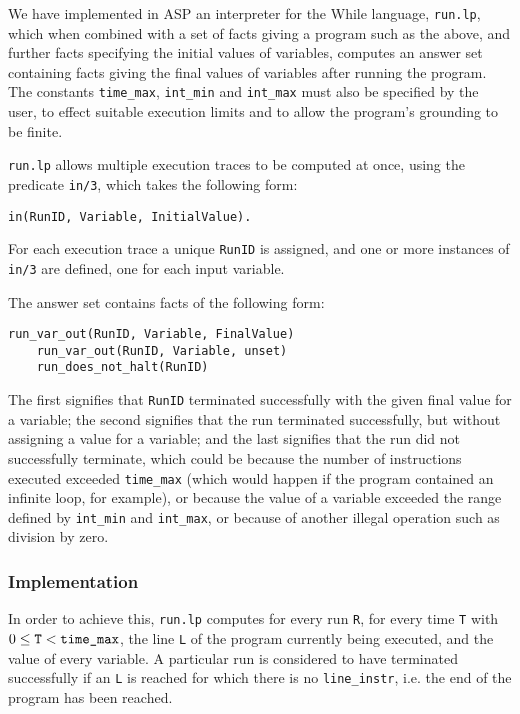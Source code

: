 \documentclass[a4paper,twoside,notitlepage]{report}
\begin{document}
We have implemented in ASP an interpreter for the While language, 
\verb|run.lp|, which when combined with a set of facts giving a program 
such as the above, and further facts specifying the initial values of 
variables, computes an answer set containing facts giving the final values 
of variables after running the program. The constants \verb|time_max|, 
\verb|int_min| and \verb|int_max| must also be specified by the user, to 
effect suitable execution limits and to allow the program's grounding to 
be finite.

\verb|run.lp| allows multiple execution traces to be computed at once, 
using the predicate \verb|in/3|, which takes the following form:
\begin{Verbatim}[samepage=true]
    in(RunID, Variable, InitialValue).
\end{Verbatim}
For each execution trace a unique \verb|RunID| is assigned, and one or 
more instances of \verb|in/3| are defined, one for each input variable.

The answer set contains facts of the following form:
\begin{Verbatim}[samepage=true]
    run_var_out(RunID, Variable, FinalValue)
    run_var_out(RunID, Variable, unset)
    run_does_not_halt(RunID)
\end{Verbatim}

The first signifies that \verb|RunID| terminated successfully with the 
given final value for a variable; the second signifies that the run 
terminated successfully, but without assigning a value for a variable; and 
the last signifies that the run did not successfully terminate, which 
could be because the number of instructions executed exceeded 
\verb|time_max| (which would happen if the program contained an infinite 
loop, for example), or because the value of a variable exceeded the range 
defined by \verb|int_min| and \verb|int_max|, or because of another 
illegal operation such as division by zero.

\subsubsection{Implementation}

In order to achieve this, \verb|run.lp| computes for 
every run \verb|R|, for every time \verb|T| with $0 \leq \verb|T| < 
\verb|time_max|$, the line \verb|L| of the program currently being 
executed, and the value of every variable. A particular run is considered 
to have terminated successfully if an \verb|L| is reached for which there 
is no \verb|line_instr|, i.e. the end of the program has been reached.
\end{document}
